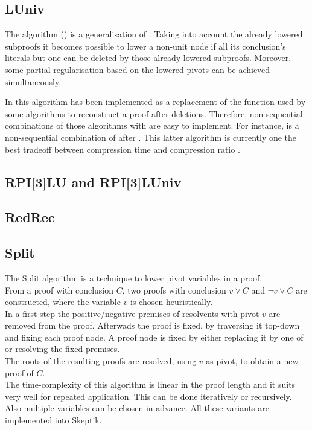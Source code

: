 \documentclass{llncs}
\begin{document}
\subsection{LUniv}

The  algorithm \cite{LUniv} () is a generalisation of
. Taking into account the already lowered subproofs it becomes possible to lower a
non-unit node if all its conclusion's literals but one can be deleted by those already lowered
subproofs. Moreover, some partial regularisation based on the lowered pivots can be achieved
simultaneously.

In \skeptik this algorithm has been implemented as a replacement of the  function
used by some algorithms to reconstruct a proof after deletions. Therefore, non-sequential
combinations of those algorithms with  are easy to implement. For instance,
 is a non-sequential combination of  after . This latter
algorithm is currently one the best tradeoff between compression time and compression ratio
\cite{LUniv}.

\subsection{RPI[3]LU and RPI[3]LUniv}

\subsection{RedRec}

\subsection{Split}

The Split \cite{CottonSplit} algorithm is a technique to lower pivot variables in a proof.\\
From a proof with conclusion $C$, two proofs with conclusion $v \vee C$ and $\neg{v} \vee C$ are constructed,  where the variable $v$ is chosen heuristically.\\
In a first step the positive/negative premises of resolvents with pivot $v$ are removed from the proof.
Afterwads the proof is fixed, by traversing it top-down and fixing each proof node.
A proof node is fixed by either replacing it by one of or resolving the fixed premises.\\ %
The roots of the resulting proofs are resolved, using $v$ as pivot, to obtain a new proof of $C$.\\
The time-complexity of this algorithm is linear in the proof length %
and it suits very well for repeated application. This can be done iteratively or recursively. Also multiple variables can be chosen in advance. 
All these variants are implemented into Skeptik.
\end{document}
